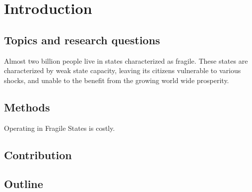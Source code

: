 \chapter{Introduction}
\section{Topics and research questions}



Almost two billion people live in states characterized as fragile. These states are characterized by weak state capacity, leaving its citizens vulnerable to various shocks, and unable to the benefit from the growing world wide prosperity.



\section{Methods}
Operating in Fragile States is costly.

\section{Contribution}


\section{Outline}